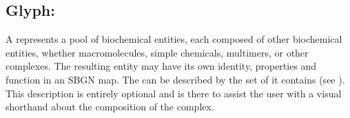 

\subsection{Glyph: }\label{sec:complex}

A  represents a pool of biochemical entities, each composed of other biochemical entities, whether macromolecules, simple chemicals, multimers, or other complexes. The resulting entity may have its own identity, properties and function in an SBGN map.
The  can be described by the set of   it contains (see ). This description is entirely optional and is there to assist the user with a visual shorthand about the composition of the complex.

